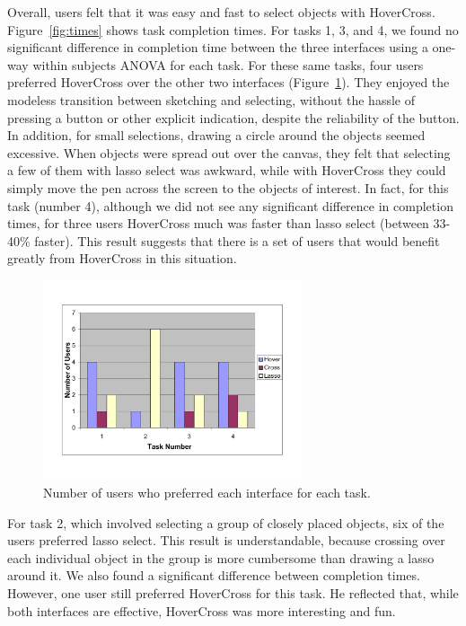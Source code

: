 \documentclass{article}
\begin{document}
Overall, users felt that it was easy and fast to select objects with
HoverCross.  Figure~\ref{fig:times} shows task completion times.  For
tasks 1, 3, and 4, we found no significant difference in completion
time between the three interfaces using a one-way within subjects
ANOVA for each task.  
For these same tasks, four users preferred HoverCross over the other
two interfaces (Figure~\ref{tab:pref}). They enjoyed the modeless
transition between sketching and selecting, without the hassle of
pressing a button or other explicit indication, despite the
reliability of the button. In addition, for small selections, drawing
a circle around the objects seemed excessive. When objects were spread
out over the canvas, they felt that selecting a few of them with lasso
select was awkward, while with HoverCross they could simply move the
pen across the screen to the objects of interest.  In fact, for this
task (number 4), although we did not see any significant difference in
completion times, for three users HoverCross much was faster than
lasso select (between 33-40\% faster).  This result suggests that
there is a set of users that would benefit greatly from HoverCross in
this situation.

\begin{figure}
\begin{center}
\includegraphics[width=3.0in]{Preferences}
\caption{Number of users who preferred each interface for each task.}
\label{tab:pref}
\end{center}
\end{figure}


For task 2, which involved selecting a group of closely placed
objects, six of the users preferred lasso select.  This result is
understandable, because crossing over each individual object in the
group is more cumbersome than drawing a lasso around it.  We also
found a significant difference between completion times. However, one
user still preferred HoverCross for this task.  He reflected that,
while both interfaces are effective, HoverCross was more interesting
and fun.
\end{document}
